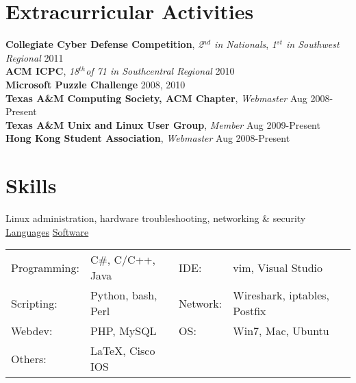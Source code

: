 \documentclass[margin,line]{res}
\newenvironment{list2}{
  \begin{list}{$\bullet$}{%
      \setlength{\itemsep}{0in}
      \setlength{\parsep}{0in} \setlength{\parskip}{0in}
      \setlength{\topsep}{0in} \setlength{\partopsep}{0in} 
      \setlength{\leftmargin}{0.18in}}}{\end{list}}
\begin{document}
\begin{resume}
%
%
\section{\sc Extracurricular Activities}
{\bf Collegiate Cyber Defense Competition}, {\em 2$^{nd}$ in Nationals}, {\em 1$^{st}$ in Southwest Regional}  \hfill 2011 \\
{\bf ACM ICPC}, {\em 18$^{th}$of 71 in Southcentral Regional} \hfill 2010 \\
{\bf Microsoft Puzzle Challenge} \hfill 2008, 2010 \\
{\bf Texas A\&M Computing Society, ACM Chapter}, {\em Webmaster} \hfill Aug 2008-Present \\
{\bf Texas A\&M Unix and Linux User Group}, {\em Member} \hfill Aug 2009-Present \\
{\bf Hong Kong Student Association}, {\em Webmaster} \hfill Aug 2008-Present

%
%


%
%
\section{\sc Skills} 
Linux administration, hardware troubleshooting, networking \& security \\
\underline{Languages} \hspace{2.51in} \underline{Software}\\
\begin{tabular}{@{}p{0.9in}p{2in}p{0.5in}p{4in}}
Programming:   & C\#, C/C++, Java           & IDE:        & vim, Visual Studio \\
Scripting:     & Python, bash, Perl         & Network:    & Wireshark, iptables, Postfix \\
Webdev:        & PHP, MySQL                 & OS:         & Win7, Mac, Ubuntu\\
Others:        & \LaTeX, Cisco IOS          & &
\end{tabular}



\end{resume}
\end{document}
